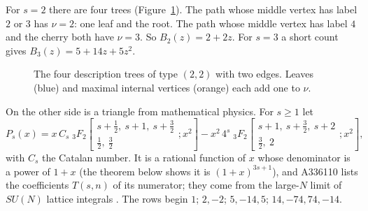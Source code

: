 \documentclass[11pt]{amsart}
\theoremstyle{remark}
\begin{document}
For $s = 2$ there are four trees (Figure~\ref{fig:s2}). The path whose middle vertex has label $2$ or $3$ has
$\nu = 2$: one leaf and the root. The path whose middle vertex has label $4$ and the cherry both have $\nu = 3$.
So $B_2(z) = 2 + 2z$. For $s = 3$ a short count gives $B_3(z) = 5 + 14z + 5z^2$.

\begin{figure}[ht]
\centering
{}
\caption{The four description trees of type $(2,2)$ with two edges. Leaves (blue) and maximal internal vertices
(orange) each add one to $\nu$.}
\label{fig:s2}
\end{figure}

On the other side is a triangle from mathematical physics. For $s \ge 1$ let
\[
  P_s(x) = x\,C_s\; {}_3F_2\!\left[\begin{matrix} s+\tfrac12,\ s+1,\ s+\tfrac32 \\ \tfrac12,\ \tfrac32 \end{matrix}; x^2\right]
  - x^2\, 4^s\; {}_3F_2\!\left[\begin{matrix} s+1,\ s+\tfrac32,\ s+2 \\ \tfrac32,\ 2 \end{matrix}; x^2\right],
\]
with $C_s$ the Catalan number. It is a rational function of $x$ whose denominator is a power of $1+x$ (the theorem
below shows it is $(1+x)^{3s+1}$), and A336110 lists the coefficients $T(s,n)$ of its numerator; they come from the
large-$N$ limit of $SU(N)$ lattice integrals \cite{BCV}. The rows begin $1$; $2,-2$; $5,-14,5$; $14,-74,74,-14$.
\end{document}

